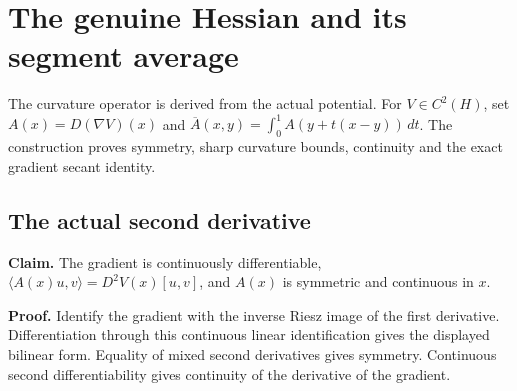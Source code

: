 \documentclass[11pt,a4paper]{report}
\begin{document}
\section{\texorpdfstring{The genuine Hessian and its segment average}{The genuine Hessian and its segment average}}
\label{proof-module-WassersteinMixing-Curvature-lean}


The curvature operator is derived from the actual potential. For \(V\in C^2(H)\), set \(A(x)=D(\nabla V)(x)\) and \(\overline A(x,y)=\int_0^1 A(y+t(x-y))\,dt\). The construction proves symmetry, sharp curvature bounds, continuity and the exact gradient secant identity.

\subsection{\texorpdfstring{The actual second derivative}{The actual second derivative}}
\label{report-step-WassersteinMixing-Curvature-lean-1}


\textbf{Claim.} The gradient is continuously differentiable, \(\langle A(x)u,v\rangle=D^2V(x)[u,v]\), and \(A(x)\) is symmetric and continuous in \(x\).



\textbf{Proof.} Identify the gradient with the inverse Riesz image of the first derivative. Differentiation through this continuous linear identification gives the displayed bilinear form. Equality of mixed second derivatives gives symmetry. Continuous second differentiability gives continuity of the derivative of the gradient.
\end{document}
